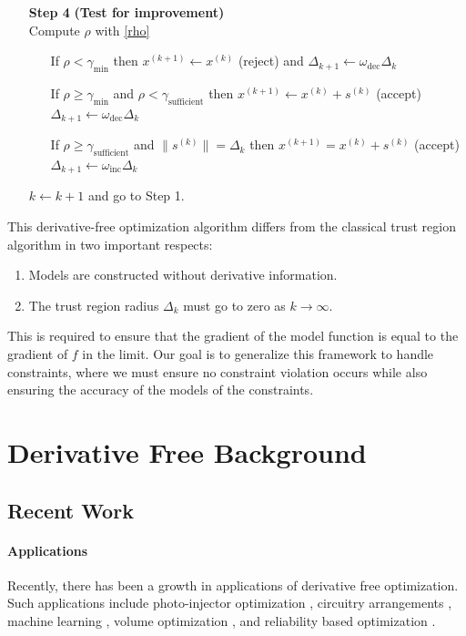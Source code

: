 \documentclass{article}
\theoremstyle{case}
\newcommand{\xk}{{x^{(k)}}}
\newcommand{\xkpo}{{{x}^{(k+1)}}}
\newcommand{\mfk}{{{m}_f}^{(k)}}
\newcommand{\sk}{{{s}^{(k)}}}
\newcommand{\omegainc}{\omega_{\text{inc}}}
\newcommand{\omegadec}{\omega_{\text{dec}}}
\newcommand{\gammasm}{\gamma_{\text{min}}}
\newcommand{\gammabi}{\gamma_{\text{sufficient}}}
\begin{document}
\begin{algorithm}[H]
\begin{itemize}
        \item[\textbf{Step 4}] \textbf{(Test for improvement)} \\
            Compute $\rho$ with \cref{rho} \begin{itemize}
                \item[] If $\rho < \gammasm$ then $\xkpo \gets \xk$ (reject) and $\Delta_{k+1} \gets \omegadec\Delta_{k}$
                \item[] If $\rho \ge \gammasm$ and $\rho < \gammabi$ then $\xkpo\gets\xk+\sk$ (accept) $\Delta_{k+1} \gets \omegadec\Delta_{k}$
                \item[] If $\rho \ge \gammabi$ and $\|\sk\| = \Delta_{k}$ then $\xkpo=\xk+\sk$ (accept) $\Delta_{k+1} \gets \omegainc\Delta_{k}$
            \end{itemize}
            $k \gets k+1$ and go to Step 1.
    \end{itemize}
\end{algorithm}

This derivative-free optimization algorithm differs from the classical trust region algorithm in two important respects:
\begin{enumerate}
    \item Models are constructed without derivative information.
    \item The trust region radius $\Delta_k$ must go to zero as $k\to\infty$.
\end{enumerate}

This is required to ensure that the gradient of the model function is equal to the gradient of $f$ in the limit.
Our goal is to generalize this framework to handle constraints, where we must ensure no constraint violation occurs while also ensuring the accuracy of the models of the constraints.

\section{Derivative Free Background}
\subsection{Recent Work}
\paragraph{Applications}

Recently, there has been a growth in applications of derivative free optimization.
Such applications include photo-injector optimization \cite{1742-6596-874-1-012062}, circuitry arrangements \cite{PLOSKAS201816}, machine learning \cite{KS2018}, volume optimization \cite{Cheng2017}, and reliability based optimization \cite{Gao2017}.
\end{document}
